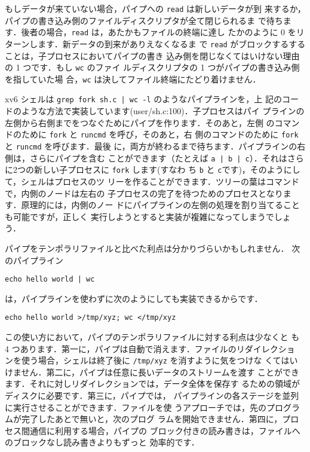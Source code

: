 もしデータが来ていない場合，パイプへの \lstinline{read} は新しいデータが到
来するか，パイプの書き込み側のファイルディスクリプタが全て閉じられるま
で待ちます．後者の場合，\lstinline{read} は，あたかもファイルの終端に達し
たかのように 0 をリターンします．新データの到来がありえなくなるま
で \lstinline{read} がブロックするすることは，子プロセスにおいてパイプの書き
込み側を閉じなくてはいけない理由の 1 つです．もし \lstinline{wc} のファイ
ルディスクリプタの 1 つがパイプの書き込み側を指していた場
合，\lstinline{wc} は決してファイル終端にたどり着けません．


xv6 シェルは \lstinline{grep fork sh.c | wc -l} のようなパイプラインを，上
記のコードのような方法で実装しています(user/sh.c:100)．子プロセスはパイ
プラインの左側から右側までをつなぐためにパイプを作ります．そのあと，左側
のコマンドのために \lstinline{fork} と \lstinline{runcmd} を呼び，そのあと，右
側のコマンドのために \lstinline{fork} と \lstinline{runcmd} を呼びます．最後
に，両方が終わるまで待ちます．パイプラインの右側は，さらにパイプを含む
ことができます（たとえば \lstinline{a | b | c}）．それはさら
に2つの新しい子プロセスに \lstinline{fork} します(すなわ
ち \lstinline{b} と \lstinline{c}です)，そのようにして，シェルはプロセスのツ
リーを作ることができます．ツリーの葉はコマンドで，内側のノードは左右の
子プロセスの完了を待つためのプロセスとなります．原理的には，内側のノー
ドにパイプラインの左側の処理を割り当てることも可能ですが，正しく
実行しようとすると実装が複雑になってしまうでしょう．

パイプをテンポラリファイルと比べた利点は分かりづらいかもしれません．
次のパイプライン
\begin{lstlisting}[]
echo hello world | wc
\end{lstlisting}
は，パイプラインを使わずに次のようにしても実装できるからです．
\begin{lstlisting}[]
echo hello world >/tmp/xyz; wc </tmp/xyz
\end{lstlisting}
この使い方において，パイプのテンポラリファイルに対する利点は少なくと
も 4 つあります．第一に，パイプは自動で消えます．ファイルのリダイレクショ
ンを使う場合，シェルは終了後に \lstinline{/tmp/xyz} を消すように気をつけな
くてはいけません．第二に，パイプは任意に長いデータのストリームを渡す
ことができます．それに対しリダイレクションでは，データ全体を保存す
るための領域がディスクに必要です．第三に，パイプでは，
パイプラインの各ステージを並列に実行させることができます．ファイルを使
うアプローチでは，先のプログラムが完了したあとで無いと，次のプログ
ラムを開始できません．第四に，プロセス間通信に利用する場合，パイプの
ブロック付きの読み書きは，ファイルへのブロックなし読み書きよりもずっと
効率的です．

